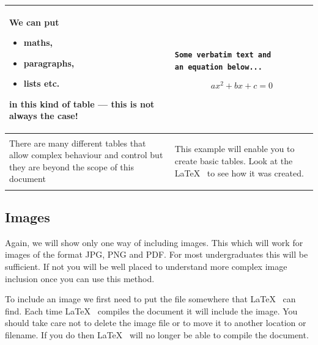 \documentclass[a4paper,14pt]{extarticle}
\begin{document}
\begin{center}
\begin{tabular}{|p{}|p{}|}
\hline
We can put \begin{itemize} \item maths, \item paragraphs, \item lists etc.\end{itemize} in this kind of table --- this is not always the case! & \begin{verbatim}
Some verbatim text and 
an equation below...
\end{verbatim} \par \[ax^2 + bx + c = 0\] \\
\hline
There are many different tables that allow complex behaviour and control but they are beyond the scope of this document & \bigskip \begin{center}This example will enable you to create basic tables. Look at the \LaTeX~ to see how it was created.\end{center} \\
\hline
\end{tabular}
\end{center}

\subsection{Images}

Again, we will show only one way of including images. This which will work for images of the format JPG, PNG and PDF. For most undergraduates this will be sufficient. If not you will be well placed to understand more complex image inclusion once you can use this method. 

To include an image we first need to put the file somewhere that \LaTeX~ can find. Each time \LaTeX~ compiles the document it will include the image. You should take care not to delete the image file or to move it to another location or filename. If you do then \LaTeX~ will no longer be able to compile the document. 
\end{document}
